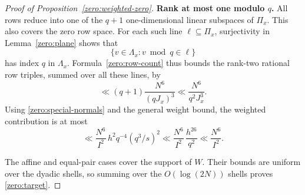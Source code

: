 \begin{proof}[Proof of Proposition~\ref{zero:weighted-zero}]
\smallskip
\noindent\textbf{Rank at most one modulo $q$.}
All rows reduce into
one of the $q+1$ one-dimensional linear subspaces of $\Pi_x$.
This also covers the zero row space.  For each such line
$\ell\subseteq\Pi_x$, surjectivity in Lemma~\ref{zero:plane}
shows that
\[
 \{v\in\Lambda_x:v\bmod q\in\ell\}
\]
has index $q$ in $\Lambda_x$.  Formula~\eqref{zero:row-count}
thus bounds the rank-two rational row triples, summed over
all these lines, by
\[
 \ll(q+1)\frac{N^6}{(qJ_x)^3}
 \ll\frac{N^6}{q^2J_x^3}.
\]
Using \eqref{zero:special-normals} and the general weight bound,
the weighted contribution is at most
\begin{equation}\label{zero:special-rank-one}
 \ll \frac{N^6}{I^2}\,h^2q^{-4}(q^3/s)^2
 \ll \frac{N^6}{I^2}\,\frac{h^{26}}{q^2}
 \ll \frac{N^6}{I^2}.
\end{equation}

The affine and equal-pair cases cover the support of $W$.
Their bounds are uniform over the dyadic shells, so summing
over the $O(\log(2N))$ shells proves \eqref{zero:target}.
\end{proof}
